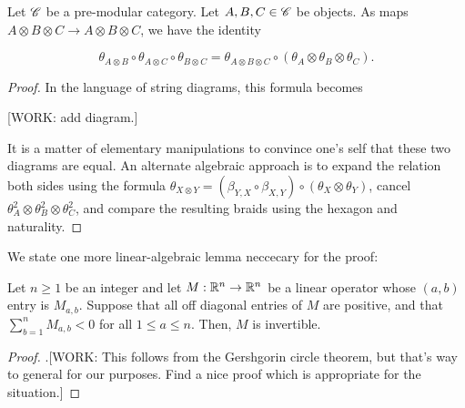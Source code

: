 \begin{lemma} Let $\mathscr{C}$ be a pre-modular category. Let $A,B,C\in \mathscr{C}$ be objects. As maps $A\otimes B\otimes C \to A\otimes B \otimes C$, we have the identity

$$\theta_{A\otimes B}\circ \theta_{A\otimes C}\circ \theta_{B\otimes C} = \theta_{A\otimes B\otimes C}\circ (\theta_{A}\otimes \theta_{B}\otimes \theta_{C}).$$
\end{lemma}
\begin{proof} In the language of string diagrams, this formula becomes

[WORK: add diagram.]

It is a matter of elementary manipulations to convince one's self that these two diagrams are equal. An alternate algebraic approach is to expand the relation both sides using the formula $\theta_{X\otimes Y}=(\beta_{Y,X}\circ \beta_{X,Y})\circ (\theta_{X}\otimes \theta_{Y})$, cancel $\theta_{A}^2\otimes \theta_{B}^2\otimes \theta_{C}^2$, and compare the resulting braids using the hexagon and naturality.
\end{proof}

We state one more linear-algebraic lemma neccecary for the proof:

\begin{lemma} Let $n\geq 1$ be an integer and let $M:\mathbb{R}^n\to \mathbb{R}^n$ be a linear operator whose $(a,b)$ entry is $M_{a,b}$. Suppose that all off diagonal entries of $M$ are positive, and that $\sum_{b=1}^n M_{a,b}<0$ for all $1\leq a\leq n$. Then, $M$ is invertible.
\end{lemma}
\begin{proof}.[WORK: This follows from the Gershgorin circle theorem, but that's way to general for our purposes. Find a nice proof which is appropriate for the situation.]
\end{proof}

